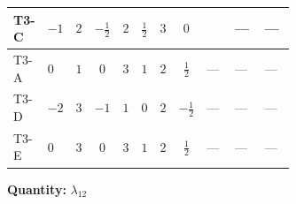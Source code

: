 \documentclass[8pt]{article}
\begin{document}
\begin{landscape}
\begin{longtable}{@{}llcccccc >{\raggedright\arraybackslash}p{0.21\linewidth} >{\raggedright\arraybackslash}p{0.21\linewidth} >{\raggedright\arraybackslash}p{0.21\linewidth}@{}}
\midrule
T3-C & $-1$ & $2$ & $-\frac{1}{2}$ & $2$ & $\frac{1}{2}$ & $3$ & $0$ & \scriptsize\adjustbox{max width=\linewidth}{$\begin{gathered} +{\lambda_{HS_2}^{(A)}} \left(-\frac{9}{16} \operatorname{Tr}\!\left({y_2}\,\left({y_1}\right)^{\dagger}\right)-\frac{3 {\lambda_{H H^\dagger S_1^\dagger S_2^\dagger}^{\rm Cross}}}{2}-\frac{3 {\lambda_{10}}}{4}\right)\end{gathered}$} & --- & --- \\
\midrule
T3-A & $0$ & $1$ & $0$ & $3$ & $1$ & $2$ & $\frac{1}{2}$ & --- & --- & --- \\
\midrule
T3-D & $-2$ & $3$ & $-1$ & $1$ & $0$ & $2$ & $-\frac{1}{2}$ & --- & --- & --- \\
\midrule
T3-E & $0$ & $3$ & $0$ & $3$ & $1$ & $2$ & $\frac{1}{2}$ & --- & --- & --- \\
\midrule
\bottomrule
\end{longtable}
\clearpage
\noindent\textbf{Quantity: }$\lambda_{12}$\par\smallskip

\end{landscape}
\end{document}
